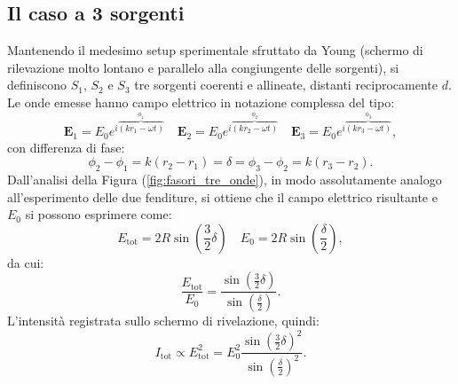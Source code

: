 \documentclass[a4paper,11pt]{report}
\begin{document}
\subsection{Il caso a 3 sorgenti}
Mantenendo il medesimo setup sperimentale sfruttato da Young (schermo di rilevazione molto lontano e parallelo alla congiungente delle sorgenti), si definiscono $S_1$, $S_2$ e $S_3$ tre sorgenti coerenti e allineate, distanti reciprocamente $d$. Le onde emesse hanno campo elettrico in notazione complessa del tipo:
\begin{equation}
\bm{E}_1 = E_0e^{i\overbrace{(kr_1-\omega t)}^{\phi_1}} \quad \bm{E}_2 = E_0e^{i\overbrace{(kr_2-\omega t)}^{\phi_2}}  \quad \bm{E}_3 = E_0e^{i\overbrace{(kr_3-\omega t)}^{\phi_3}} , 
\end{equation}
con differenza di fase:
\begin{equation}
\phi_2-\phi_1 = k(r_2-r_1) = \delta = \phi_3 -\phi_2 = k(r_3-r_2).
\end{equation}
Dall'analisi della Figura (\ref{fig:fasori_tre_onde}), in modo assolutamente analogo all'esperimento delle due fenditure, si ottiene che il campo elettrico risultante e $E_0$ si possono esprimere come:
\begin{equation}
E_{\text{tot}} = 2R\sin\left(\frac{3}{2}\delta\right) \quad E_{\text{0}} = 2R\sin\left(\frac{\delta}{2}\right), 
\end{equation}
da cui:
\begin{equation}
\frac{E_{\text{tot}}}{E_0}= \frac{\sin\left(\frac{3}{2}\delta\right)}{\sin\left(\frac{\delta}{2}\right)}.
\end{equation}
L'intensità registrata sullo schermo di rivelazione, quindi:
\begin{equation}
I_{\text{tot}} \propto E_{\text{tot}}^2 = E_0^2 \frac{\sin\left(\frac{3}{2}\delta\right)^2}{\sin\left(\frac{\delta}{2}\right)^2}.
\end{equation}
\end{document}
